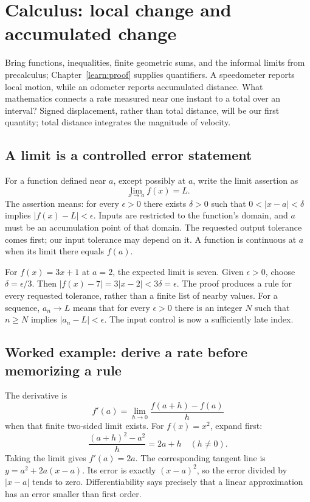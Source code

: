 \chapter{Calculus: local change and accumulated change}
\label{learn:calculus}



Bring functions, inequalities, finite geometric sums, and the informal limits
from precalculus; Chapter~\ref{learn:proof} supplies quantifiers. A speedometer
reports local motion, while an odometer reports accumulated distance. What
mathematics connects a rate measured near one instant to a total over an
interval? Signed displacement, rather than total distance, will be our first
quantity; total distance integrates the magnitude of velocity.



\section{A limit is a controlled error statement}
For a function defined near $a$, except possibly at $a$, write the limit assertion as
\[\lim_{x\to a}f(x)=L.\]
The assertion means: for every $\epsilon>0$ there exists
$\delta>0$ such that $0<|x-a|<\delta$ implies $|f(x)-L|<\epsilon$.
Inputs are restricted to the function's domain, and $a$ must be an
accumulation point of that domain. The requested output tolerance comes
first; our input tolerance may depend on it. A function is continuous at
$a$ when its limit there equals $f(a)$.

For $f(x)=3x+1$ at $a=2$, the expected limit is seven. Given
$\epsilon>0$, choose $\delta=\epsilon/3$. Then
$|f(x)-7|=3|x-2|<3\delta=\epsilon$. The proof produces a rule
for every requested tolerance, rather than a finite list of nearby values.
For a sequence, $a_n\to L$ means that for every $\epsilon>0$ there is
an integer $N$ such that $n\geq N$ implies $|a_n-L|<\epsilon$.
The input control is now a sufficiently late index.

\section{Worked example: derive a rate before memorizing a rule}
The derivative is
\[
 f'(a)=\lim_{h\to0}\frac{f(a+h)-f(a)}h
\]
when that finite two-sided limit exists. For $f(x)=x^2$, expand first:
\[
 \frac{(a+h)^2-a^2}{h}=2a+h\quad(h\ne0).
\]
Taking the limit gives $f'(a)=2a$. The corresponding tangent line is
$y=a^2+2a(x-a)$. Its error is exactly $(x-a)^2$, so the error divided
by $|x-a|$ tends to zero. Differentiability says precisely that a linear
approximation has an error smaller than first order.

